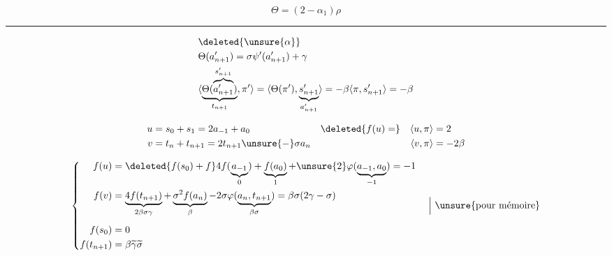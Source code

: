 
\[
\Theta=(2-\alpha_1)\rho
\]

\deleted{\[
\begin{aligned}
\sigma\sigma'-\beta&=\underbrace{(2-\alpha_1)}\rho
& n=3 \qquad \alpha_0,\alpha_1,\alpha_2\quad\text{\unsure{paramètres}}\\
&\quad(4-\beta_1)=L_2(\beta_1)=
\end{aligned}
\]}

\deleted{\[
\boxed{\sigma\sigma'-\beta=
 \underbrace{L_{n-1}(\beta_1,\ldots,\beta_{n-2})}\rho^{\deleted{\unsure{\xi}}}}
\]}

\deleted{\[
\begin{aligned}
\rule{1.1cm}{.5pt}\qquad &\overset{\scriptscriptstyle\Vert}{\zeta_1}=L_{n-1}(\,\\
\rule{1.1cm}{.4pt}\qquad &i=n-1
\end{aligned}
\]}

\deleted{\[
\psi'\psi=\beta\,\mathrm{id}+\gamma\,\widetilde{\unsure{o|\sigma}}'\otimes\widetilde{o}
\qquad
\left\{\begin{aligned}
\beta&=\beta_0\beta_1\cdots\beta_{n-1}\\
\gamma&=L_{n-1}(\beta_1,\ldots,\beta_{n-2})
\end{aligned}\right.\quad ?
\]}

\noindent\rule{.60\linewidth}{.4pt}

\[
\begin{aligned}
&\deleted{\unsure{\alpha}}\\
&\Theta(a'_{n+1})=\sigma\psi'(a'_{n+1})+\gamma\\
&\langle\underbrace{\Theta(\overbrace{a'_{n+1}}^{s'_{n+1}})}_{t_{n+1}},\pi'\rangle
=\langle\Theta(\pi'),\underbrace{s'_{n+1}}_{a'_{n+1}}\rangle
=-\beta\langle\pi,s'_{n+1}\rangle=-\beta
\end{aligned}
\]

\[
\begin{aligned}
u&=s_0+s_1=2a_{-1}+a_0
&\deleted{f(u)=}\quad\langle u,\pi\rangle&=2\\
v&=t_n+t_{n+1}=2t_{n+1}\unsure{-}\sigma a_n
&\langle v,\pi\rangle&=-2\beta
\end{aligned}
\]

\[
\left\{\begin{aligned}
f(u)&=\deleted{f(s_0)+f}4f(\underbrace{a_{-1}}_{0})+
 \underbrace{f(a_0)}_{1}+\unsure{2}\varphi(\underbrace{a_{-1},a_0}_{-1})=-1\\
f(v)&=\underbrace{4f(t_{n+1})}_{2\beta\sigma\gamma}+
 \underbrace{\sigma^2f(a_n)}_{\beta}-
 2\sigma\varphi(\underbrace{a_n,t_{n+1}}_{\beta\sigma})
 =\beta\sigma(2\gamma-\sigma)\\[1ex]
f(s_0)&=0\\
f(t_{n+1})&=\beta\widetilde{\gamma}\widetilde{\sigma}
\end{aligned}\right.\quad\Big|\ \text{\unsure{pour mémoire}}
\]

